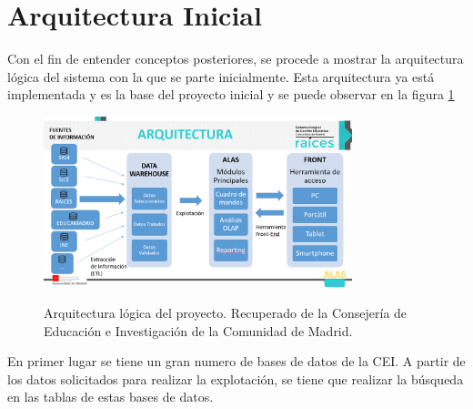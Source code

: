 \section{Arquitectura Inicial}
Con el fin de entender conceptos posteriores, se procede a mostrar la arquitectura lógica del sistema con la que se parte inicialmente. Esta arquitectura ya está implementada y es la base del proyecto inicial y se puede observar en la figura \ref{fig:arquitecturaDWH2}
\begin{figure}[h]
	\centering
	\caption{Arquitectura lógica del proyecto. Recuperado de la Consejería de Educación e Investigación de la Comunidad de Madrid.}
	\includegraphics[width=0.8\textwidth]{recursos/arquitecturaDWH2}
	\label{fig:arquitecturaDWH2}
\end{figure}
\FloatBarrier

En primer lugar se tiene un gran numero de bases de datos de la CEI. A partir de los datos solicitados para realizar la explotación, se tiene que realizar la búsqueda en las tablas de estas bases de datos.

